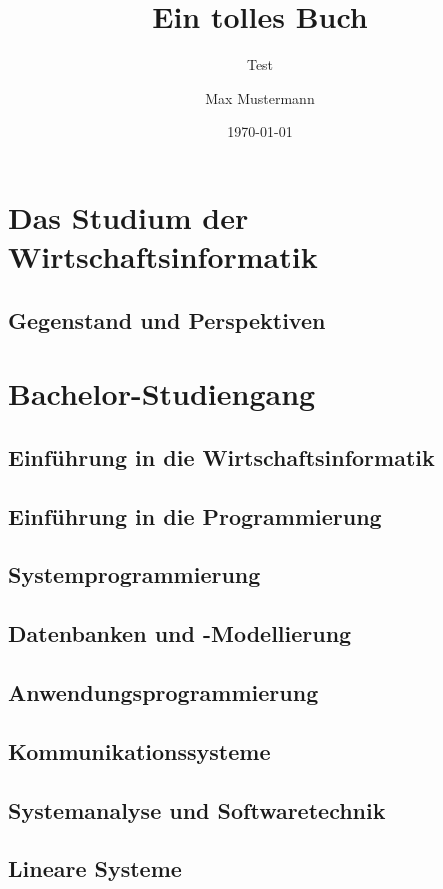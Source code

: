 \documentclass{hswbook}
\author{Max Mustermann}
\date{\today}
\title{Ein tolles Buch}
\subtitle{Test}
\begin{document}
\maketitle

\clearpage
\tableofcontents
\listoffigures
\listoftables


%
%
%
\part{Das Studium der Wirtschaftsinformatik}
    \chapter{Gegenstand und Perspektiven}
    \chapter{}

%
%
%
\part{Bachelor-Studiengang}
    \chapter{Einführung in die Wirtschaftsinformatik}
    \chapter{Einführung in die Programmierung}
    \chapter{Systemprogrammierung}
    \chapter{Datenbanken und -Modellierung}
    \chapter{Anwendungsprogrammierung}
    \chapter{Kommunikationssysteme}
    \chapter{Systemanalyse und Softwaretechnik}
    \chapter{Lineare Systeme}
\end{document}

